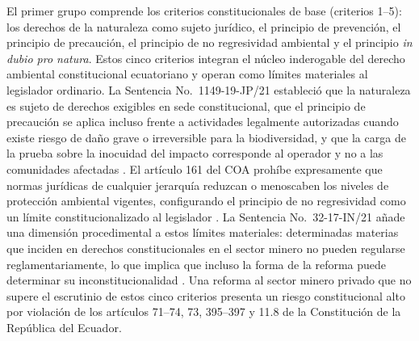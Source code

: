 El primer grupo comprende los criterios constitucionales de base (criterios 1--5): los derechos de la naturaleza como sujeto jurídico, el principio de prevención, el principio de precaución, el principio de no regresividad ambiental y el principio \textit{in dubio pro natura}. Estos cinco criterios integran el núcleo inderogable del derecho ambiental constitucional ecuatoriano y operan como límites materiales al legislador ordinario. La Sentencia No.\ 1149-19-JP/21 estableció que la naturaleza es sujeto de derechos exigibles en sede constitucional, que el principio de precaución se aplica incluso frente a actividades legalmente autorizadas cuando existe riesgo de daño grave o irreversible para la biodiversidad, y que la carga de la prueba sobre la inocuidad del impacto corresponde al operador y no a las comunidades afectadas \parencite{cce_1149_19_jp_21}. El artículo 161 del COA prohíbe expresamente que normas jurídicas de cualquier jerarquía reduzcan o menoscaben los niveles de protección ambiental vigentes, configurando el principio de no regresividad como un límite constitucionalizado al legislador \parencite{coa_2017}. La Sentencia No.\ 32-17-IN/21 añade una dimensión procedimental a estos límites materiales: determinadas materias que inciden en derechos constitucionales en el sector minero no pueden regularse reglamentariamente, lo que implica que incluso la forma de la reforma puede determinar su inconstitucionalidad \parencite{cce_32_17_in_21}. Una reforma al sector minero privado que no supere el escrutinio de estos cinco criterios presenta un riesgo constitucional alto por violación de los artículos 71--74, 73, 395--397 y 11.8 de la Constitución de la República del Ecuador.

